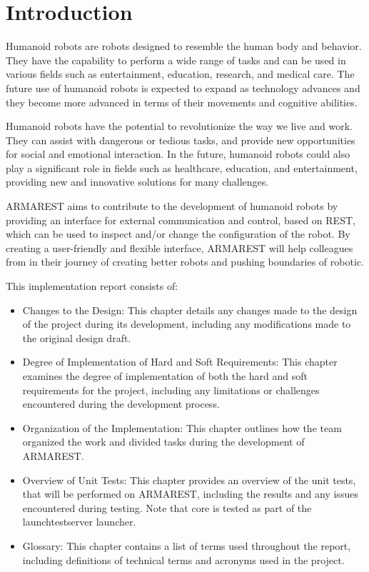 
\chapter{Introduction}

Humanoid robots are robots designed to resemble the human body and behavior. They have the capability to perform a wide range of tasks and can be used in various fields such as entertainment, education, research, and medical care. The future use of humanoid robots is expected to expand as technology advances and they become more advanced in terms of their movements and cognitive abilities.

Humanoid robots have the potential to revolutionize the way we live and work. They can assist with dangerous or tedious tasks, and provide new opportunities for social and emotional interaction. In the future, humanoid robots could also play a significant role in fields such as healthcare, education, and entertainment, providing new and innovative solutions for many challenges.

ARMAREST aims to contribute to the development of humanoid robots by providing an interface for external communication and control, based on REST, which can be used to inspect and/or change the configuration of the robot. By creating a user-friendly and flexible interface, ARMAREST will help colleagues from \hht in their journey of creating better robots and pushing boundaries of robotic.

This implementation report consists of:
\begin{itemize}
    \item Changes to the Design: This chapter details any changes made to the design of the project during its development, including any modifications made to the original design draft.
    \item Degree of Implementation of Hard and Soft Requirements: This chapter examines the degree of implementation of both the hard and soft requirements for the project, including any limitations or challenges encountered during the development process.
    \item Organization of the Implementation: This chapter outlines how the team organized the work and divided tasks during the development of ARMAREST.
\item Overview of Unit Tests: This chapter provides an overview of the unit tests, that will be performed on ARMAREST, including the results and any issues encountered during testing. Note that core is tested as part of the launchtestserver launcher.
    \item Glossary: This chapter contains a list of terms used throughout the report, including definitions of technical terms and acronyms used in the project.
\end{itemize}
